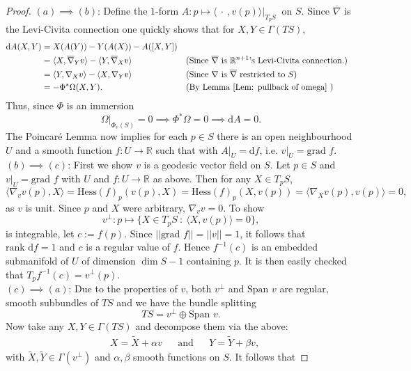 \documentclass[12pt]{amsart}
\theoremstyle{plain}
\theoremstyle{definition}
\def\R{\mathbb{R}}
\newcommand{\td}{\mathrm{d}}
\numberwithin{equation}{section}
\begin{document}
\begin{proof}
    $(a)\!\implies\!(b)$: Define the $1$-form $ A:p \mapsto \langle ~\cdot~, v(p)\rangle\Big|_{T_pS}~
    $ on $S$. Since $\overline{\nabla}$ is the Levi-Civita connection one quickly shows that for $X,Y\in \Gamma(TS)$,
    \begin{align*}
    \td A(X,Y)&=X(A(Y))-Y(A(X))-A([X,Y])\\
    &=\langle X,\overline{\nabla}_Yv\rangle-\langle Y,\overline{\nabla}_X v\rangle &&\text{(Since $\overline{\nabla}$ is $\mathbb{R}^{n+1}$'s Levi-Civita connection.)}\\
    &=\langle Y,\nabla_Xv\rangle-\langle X,\nabla_Y v\rangle &&\text{(Since $\nabla$ is $\overline{\nabla}$ restricted to $S$)}\\
    &=-\Phi^\ast\Omega(X,Y). &&\text{(By Lemma \ref{Lem: pullback of omega} )}
    \end{align*}
    Thus, since $\Phi$ is an immersion
    \[
    \Omega|_{\Phi_v(S)}=0 \implies \Phi^\ast\Omega=0 \implies \td A=0.
    \]
    The Poincaré Lemma now implies for each $p\in S$ there is an open neighbourhood $U$ and a smooth function $f:U\to \mathbb{R}$ such that with $A|_U=\td f$, i.e. $v|_U=\mbox{grad~}f$.\\
    $(b) \! \implies \! (c)$: First we show $v$ is a geodesic vector field on $S$. Let $p\in S$ and $v|_U=\mbox{grad~}f$ with $U$ and $f:U\to\R$ as above. Then for any $X\in T_pS$,
    \[
    \langle \nabla_{v}v(p),X\rangle=\mbox{Hess}(f)_p(v(p),X)=\mbox{Hess}(f)_p(X,v(p))=\langle \nabla_Xv(p),v(p)\rangle=0,
    \]
    as $v$ is unit. Since $p$ and $X$ were arbitrary, $\nabla_vv=0$. To show
    \[
        v^\bot:p\mapsto \{X\in T_pS~:~\langle X,v(p) \rangle=0\},
    \]
        is integrable, let $c:=f(p)$. Since $||\mbox{grad~}f||=||v||=1$, it follows that $\mbox{rank~}\td f=1$ and $c$ is a regular value of $f$. Hence $f^{-1}(c)$ is an embedded submanifold of $U$ of dimension $\dim S-1$ containing $p$. It is then easily checked that $T_pf^{-1}(c)=v^\bot(p)$.\\
    $(c)\! \implies \! (a)$: Due to the properties of $v$, both $v^\perp$ and $\mbox{Span~}v$ are regular, smooth subbundles of $TS$ and we have the bundle splitting
    \[
    TS=v^\perp\oplus \mbox{Span~}v.
    \]
    Now take any $X,Y\in \Gamma(TS)$ and decompose them via the above:
    \begin{align*}
        &X=\widetilde{X}+\alpha v &&\text{and} &&Y=\widetilde{Y}+\beta v,
    \end{align*}
    with $\widetilde{X},\widetilde{Y}\in \Gamma( v^\perp)$ and $\alpha,\beta$ smooth functions on $S$. It follows that

\end{proof}
\end{document}
